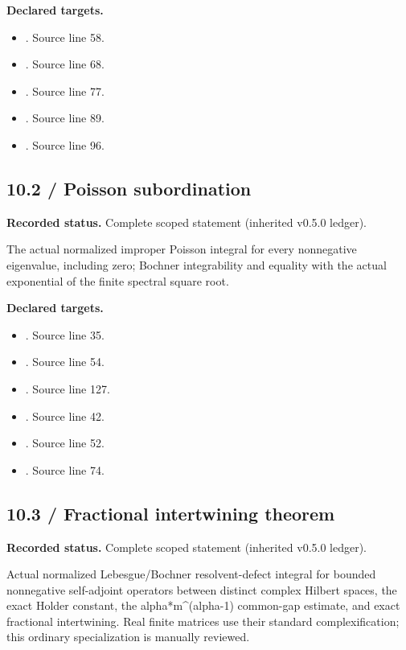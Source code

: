 \textbf{Declared targets.}\begin{itemize}
\item {}. Source line 58.
\item {}. Source line 68.
\item {}. Source line 77.
\item {}. Source line 89.
\item {}. Source line 96.
\end{itemize}
\subsection{10.2 / Poisson subordination}
\label{result:10.2}
\textbf{Recorded status.} Complete scoped statement (inherited v0.5.0 ledger).\par
The actual normalized improper Poisson integral for every nonnegative eigenvalue, including zero; Bochner integrability and equality with the actual exponential of the finite spectral square root.

\textbf{Declared targets.}\begin{itemize}
\item {}. Source line 35.
\item {}. Source line 54.
\item {}. Source line 127.
\item {}. Source line 42.
\item {}. Source line 52.
\item {}. Source line 74.
\end{itemize}
\subsection{10.3 / Fractional intertwining theorem}
\label{result:10.3}
\textbf{Recorded status.} Complete scoped statement (inherited v0.5.0 ledger).\par
Actual normalized Lebesgue/Bochner resolvent-defect integral for bounded nonnegative self-adjoint operators between distinct complex Hilbert spaces, the exact Holder constant, the alpha*m\textasciicircum{}(alpha-1) common-gap estimate, and exact fractional intertwining. Real finite matrices use their standard complexification; this ordinary specialization is manually reviewed.

